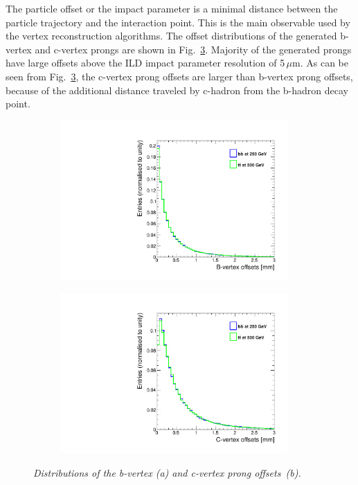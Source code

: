 The particle offset or the impact parameter is a minimal distance between the particle trajectory and the interaction point. 
This is the main observable used by the vertex reconstruction algorithms. 
The offset distributions of the generated b-vertex and c-vertex prongs are shown in Fig.~\ref{fig:GenVtxOffset_3}.
Majority of the generated prongs have large offsets above the ILD impact parameter resolution of 5\,$\mu$m. 
As can be seen from Fig.~\ref{fig:GenVtxOffset_3}, the c-vertex prong offsets are larger than b-vertex prong offsets, because of the additional distance traveled by c-hadron from the b-hadron decay point. 

\begin{figure}[h]
\centering
\begin{subfigure}{0.5\textwidth}
    \includegraphics[width=0.95\textwidth]{ILD/plots/gen-bvtx-offsets.pdf}
\caption{\label{fig:GenVtxOffset_a_3} }
\end{subfigure}%
  \begin{subfigure}{0.5\textwidth}
\centering
    \includegraphics[width=0.95\textwidth]{ILD/plots/gen-cvtx-offsets.pdf}
\caption{\label{fig:GenVtxOffset_b_3} }
\end{subfigure}
    \caption{\sl Distributions of the b-vertex (a) and c-vertex prong offsets~(b). }
    \label{fig:GenVtxOffset_3}
\end{figure}


